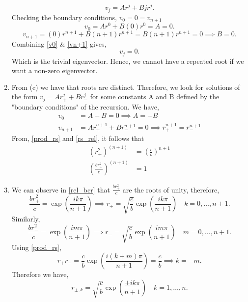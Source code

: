 \documentclass{report}
\begin{document}
\begin{solution}
\begin{enumerate}[label=(\alph*)]
		      \[
			      v_{j} = Ar^j + Bjr^j
			      .\]
		      Checking the boundary conditions,
		      $v_{0} = 0= v_{n+1}$
		      \begin{equation}
			      v_0 = A r^0 + B(0)r^{0} = A = 0 \label{v0}
			      .\end{equation}
		      \begin{equation}
			      v_{n+1} = (0) r^{n+1} + B(n+1)r^{n+1} = B(n+1)r^{n+1} = 0      \implies B =0 \label{vn+1}
			      .\end{equation}
		      Combining \ref{v0} \& \ref{vn+1} gives,
		      \[
			      v_j  =0
			      .\]
		      Which is the trivial eigenvector. Hence, we cannot have a repeated root if we want a non-zero eigenvector.
		\item From (c) we have that roots are distinct. Therefore, we look for solutions of the form $v_{j} = Ar_{+}^j + Br_{-}^j$ for some constants A and B defined by the "boundary conditions" of the recursion.
		      We have,
		      \begin{align}
			      v_{0}   & = A+B = 0 \implies A = -B    \nonumber \\
			      v_{n+1} & =  Ar_{+}^{n+1}  + Br_{-}^{n+1} =0 \implies r_{+}^{n+1} = r_{-}^{n+1} \label{rs_rel}
		      \end{align}
		      From, \ref{prod_rs} and \ref{rs_rel}, it follows that
		      \begin{align}
			      \left( r_{+}^{2} \right)^{(n+1)}          & =  \left( \frac{c}{b} \right)^{n+1} \nonumber \\
			      \left( \frac{br_{+}^2}{c} \right)^{(n+1)} & = 1 \label{rel_bcr}
		      \end{align}
		\item  We can observe in \ref{rel_bcr} that $\frac{br_{+}^{2}}{c}$ are the roots of unity, therefore,
		      \[
			      \frac{br_{+}^{2}}{c} = \exp\left( \frac{ik\pi}{n+1} \right) \implies r_{+} =  \sqrt{\frac{c}{b}} \exp\left( \frac{ik\pi}{n+1} \right) \quad k =0,\dots, n+1
			      .\]
		      Similarly,
		      \[
			      \frac{br_{-}^{2}}{c} = \exp\left( \frac{im\pi}{n+1} \right) \implies r_{-} =  \sqrt{\frac{c}{b}} \exp\left( \frac{im\pi}{n+1} \right) \quad m =0,\dots, n+1
			      .\]
		      Using \ref{prod_rs},
		      \[
			      r_{+}r_{-} =\frac{c}{b} \exp\left( \frac{i\left( k+m \right) \pi}{n+1} \right)=\frac{c}{b} \implies k=-m
			      .\]
		      Therefore we have,
		      \[
			      r_{\pm,k} = \sqrt{\frac{c}{b}} \exp\left( \frac{\pm ik\pi}{n+1} \right) \quad k=1,\dots, n
			      .\]
	\end{enumerate}
\end{solution}
\end{document}
